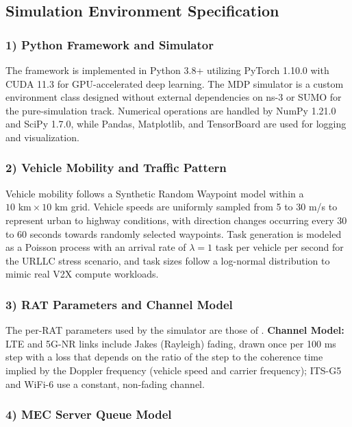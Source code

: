 \subsection{Simulation Environment Specification}

\subsubsection*{1) Python Framework and Simulator}

The framework is implemented in Python 3.8+ utilizing PyTorch 1.10.0 with CUDA 11.3 for GPU-accelerated deep learning. The MDP simulator is a custom environment class designed without external dependencies on ns-3 or SUMO for the pure-simulation track. Numerical operations are handled by NumPy 1.21.0 and SciPy 1.7.0, while Pandas, Matplotlib, and TensorBoard are used for logging and visualization.

\subsubsection*{2) Vehicle Mobility and Traffic Pattern}

Vehicle mobility follows a Synthetic Random Waypoint model within a $10 \text{ km} \times 10 \text{ km}$ grid. Vehicle speeds are uniformly sampled from 5 to 30 m/s to represent urban to highway conditions, with direction changes occurring every 30 to 60 seconds towards randomly selected waypoints. Task generation is modeled as a Poisson process with an arrival rate of $\lambda = 1$ task per vehicle per second for the URLLC stress scenario, and task sizes follow a log-normal distribution to mimic real V2X compute workloads.

\subsubsection*{3) RAT Parameters and Channel Model}

The per-RAT parameters used by the simulator are those of . \textbf{Channel Model:} LTE and 5G-NR links include Jakes (Rayleigh) fading, drawn once per 100 ms step with a loss that depends on the ratio of the step to the coherence time implied by the Doppler frequency (vehicle speed and carrier frequency); ITS-G5 and WiFi-6 use a constant, non-fading channel.

\subsubsection*{4) MEC Server Queue Model}

